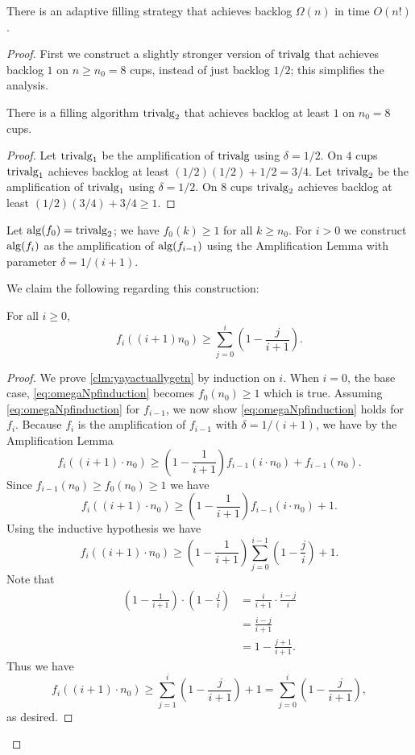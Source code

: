 \begin{theorem}
  \label{thm:factorialTimeAlg}
  There is an adaptive filling strategy that
  achieves backlog $\Omega(n)$ in time $O(n!)$.
\end{theorem}
\begin{proof}
  First we construct a slightly stronger version of $\operatorname{\text{\textup{trivalg}}}$
  that achieves backlog $1$ on $n \ge n_0=8$ cups, instead of
  just backlog $1/2$; this simplifies the analysis.
  \begin{clm}
    There is a filling algorithm $\operatorname{\text{\textup{trivalg}}}_2$ that achieves
    backlog at least $1$ on $n_0 = 8$ cups.
  \end{clm}
  \begin{proof}
    Let $\operatorname{\text{\textup{trivalg}}}_1$ be the amplification of $\operatorname{\text{\textup{trivalg}}}$ using
    $\delta = 1/2$. On $4$ cups $\operatorname{\text{\textup{trivalg}}}_1$ achieves backlog at
    least $(1/2)(1/2)+1/2 = 3/4$.
    Let $\operatorname{\text{\textup{trivalg}}}_2$ be the amplification of $\operatorname{\text{\textup{trivalg}}}_1$ using
    $\delta = 1/2$. On $8$ cups $\operatorname{\text{\textup{trivalg}}}_2$ achieves backlog at
    least $(1/2)(3/4) + 3/4 \ge 1$.
  \end{proof}

  Let $\operatorname{\text{\textup{alg}}}(f_0)=\operatorname{\text{\textup{trivalg}}}_2$; we have $f_0(k) \ge 1$ for all $k
  \ge n_0$. For $i > 0$ we construct $\operatorname{\text{\textup{alg}}}(f_{i})$ as the
  amplification of $\operatorname{\text{\textup{alg}}}(f_{i-1})$ using the Amplification Lemma
  with parameter $\delta = 1/(i+1)$. 

  We claim the following regarding this construction:
  \begin{clm}
    \label{clm:yayactuallygetn}
  For all $i\ge 0$,
  \begin{equation}
    \label{eq:omegaNpfinduction}
    f_i((i+1)n_0) \ge \sum_{j=0}^i \left(1-\frac{j}{i+1}\right).
  \end{equation}
  \end{clm}
  \begin{proof}
  We prove \cref{clm:yayactuallygetn} by induction on $i$. When
  $i=0$, the base case, \eqref{eq:omegaNpfinduction} becomes
  $f_{0}(n_0) \ge 1$ which is true. Assuming
  \eqref{eq:omegaNpfinduction} for $f_{i-1}$, we now show
  \eqref{eq:omegaNpfinduction} holds for $f_{i}$.
  Because $f_{i}$ is the amplification of $f_{i-1}$ with $\delta = 1/(i+1)$, we have by the Amplification Lemma
  $$f_{i}((i+1)\cdot n_0) \ge \left(1 - \frac{1}{i+1}\right) f_{i-1}(i\cdot n_0) + f_{i-1}(n_0).$$
  Since $f_{i-1}(n_0) \ge f_0(n_0) \ge 1$ we have
  $$f_{i}((i+1)\cdot n_0) \ge \left(1 - \frac{1}{i+1}\right) f_{i-1}(i\cdot n_0) + 1.$$
  Using the inductive hypothesis we have
  $$f_{i}((i+1)\cdot n_0) \ge \left(1 - \frac{1}{i+1}\right)\sum_{j=0}^{i-1} \left(1-\frac{j}{i}\right) + 1.$$
  Note that 
  \begin{align*}
    \left(1 - \frac{1}{i+1}\right)\cdot \left(1-\frac{j}{i}\right) &= \frac{i}{i+1} \cdot \frac{i-j}{i} \\
  &= \frac{i-j}{i+1}\\
  &= 1 - \frac{j+1}{i+1}.
  \end{align*}
  Thus we have
  $$f_{i}((i+1)\cdot n_0) \ge \sum_{j=1}^{i} \left(1-\frac{j}{i+1}\right) + 1 = \sum_{j=0}^{i} \left(1-\frac{j}{i+1}\right),$$
  as desired.
  \end{proof}


\end{proof}
